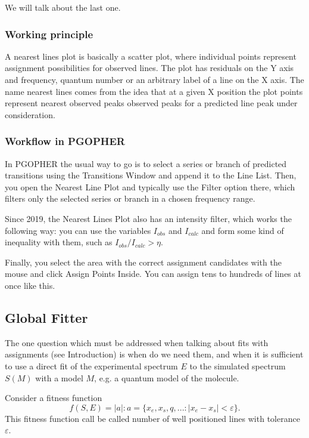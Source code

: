 \documentclass[11pt]{article}
\begin{document}
We will talk about the last one. 

\subsubsection{Working principle}

A nearest lines plot is basically a scatter plot, where individual points represent assignment possibilities for observed lines. The plot has residuals on the Y axis and frequency, quantum number or an arbitrary label of a line on the X axis. The name nearest lines comes from the idea that at a given X position the plot points represent nearest observed peaks observed peaks for a predicted line peak under consideration. 

\subsubsection{Workflow in PGOPHER}

In PGOPHER the usual way to go is to select a series or branch of predicted transitions using the Transitions Window and append it to the Line List. Then, you open the Nearest Line Plot and typically use the Filter option there, which filters only the selected series or branch in a chosen frequency range. 

Since 2019, the Nearest Lines Plot also has an intensity filter, which works the following way: you can use the variables $I_{obs}$ and $I_{calc}$ and form some kind of inequality with them, such as $I_{obs} / I_{calc} > \eta$.

Finally, you select the area with the correct assignment candidates with the mouse and click Assign Points Inside. You can assign tens to hundreds of lines at once like this. 
\subsection{Global Fitter}

The one question which must be addressed when talking about fits with assignments (see Introduction) is when do we need them, and when it is sufficient to use a direct fit of the experimental spectrum $E$ to the simulated spectrum $S(M)$ with a model $M$, e.g. a quantum model of the molecule.

Consider a fitness function 
\begin{equation}
    f(S, E) = |a|: a = \{x_e, x_s, q, ...: |x_e - x_s| < \varepsilon\}.
\end{equation}
This fitness function call be called number of well positioned lines with tolerance $\varepsilon$.
\end{document}
